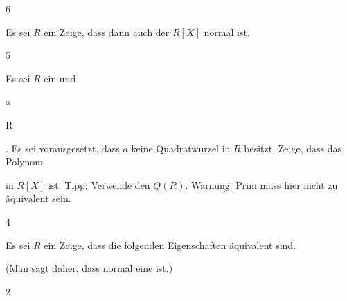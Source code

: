 {6}

{


Es sei $R$ ein
Zeige, dass dann auch der
$R[X]$ normal ist.


}

{} {}



{5}

{


Es sei $R$ ein
und


\mavergleichskette

{\vergleichskette

{ a
}

{ \in }{ R
}

{  }{
}

{    }{
}

{   }{
}

}
{}{}{.}
Es sei vorausgesetzt, dass $a$ keine Quadratwurzel in $R$ besitzt. Zeige, dass das Polynom

in $R[X]$ ist. Tipp: Verwende den
$Q(R)$. Warnung: Prim muss hier nicht zu
äquivalent sein.


}

{} {}



{4}

{


Es sei $R$ ein
Zeige, dass die folgenden Eigenschaften äquivalent sind.


}

{(Man sagt daher, dass normal eine  {} ist.)} {}



{2}

